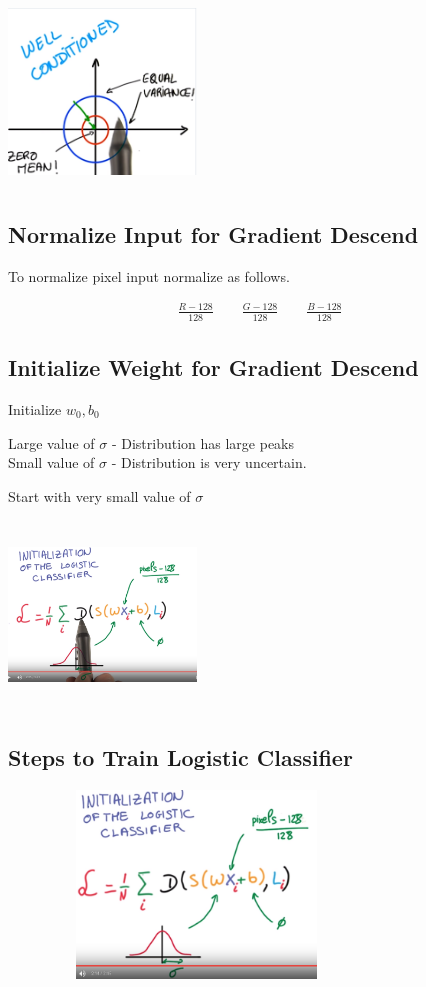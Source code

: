 \documentclass[a4paper,10pt]{article}
\begin{document}
\includegraphics[width=5cm, height=5cm]{zeromean}

\subsection{Normalize Input for Gradient Descend}

To normalize pixel input normalize as follows.

\begin{align*}
\frac{R-128}{128} \qquad	\frac{G-128}{128}	\qquad \frac{B-128}{128}
\end{align*}

\subsection{Initialize Weight for Gradient Descend}

Initialize $w_0, b_0$



Large  value of $\sigma$ - Distribution has large peaks \\
Small value of $\sigma$ - Distribution is very uncertain.

Start with very small value of $\sigma$

 \includegraphics[width=5cm,height=5cm]{initializelogicclassifier}
 \subsection{Steps to Train Logistic Classifier}
 \includegraphics[width=10cm, height=5cm]{trainlogicclassifier}
 
\end{document}
